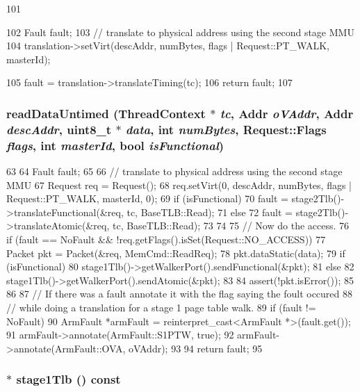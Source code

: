 \begin{DoxyCode}
101 {
102     Fault fault;
103     // translate to physical address using the second stage MMU
104     translation->setVirt(descAddr, numBytes, flags | Request::PT_WALK, masterId);
      
105     fault = translation->translateTiming(tc);
106     return fault;
107 }
\end{DoxyCode}
\hypertarget{classArmISA_1_1Stage2MMU_ac040aef55a7ff520560957793f33f2d0}{
\subsubsection[{readDataUntimed}]{ readDataUntimed ({\bf ThreadContext} $\ast$ {\em tc}, \/  {\bf Addr} {\em oVAddr}, \/  {\bf Addr} {\em descAddr}, \/  uint8\_\-t $\ast$ {\em data}, \/  int {\em numBytes}, \/  {\bf Request::Flags} {\em flags}, \/  int {\em masterId}, \/  bool {\em isFunctional})}}
\label{classArmISA_1_1Stage2MMU_ac040aef55a7ff520560957793f33f2d0}



\begin{DoxyCode}
63 {
64     Fault fault;
65 
66     // translate to physical address using the second stage MMU
67     Request req = Request();
68     req.setVirt(0, descAddr, numBytes, flags | Request::PT_WALK, masterId, 0);
69     if (isFunctional) {
70         fault = stage2Tlb()->translateFunctional(&req, tc, BaseTLB::Read);
71     } else {
72         fault = stage2Tlb()->translateAtomic(&req, tc, BaseTLB::Read);
73     }
74 
75     // Now do the access.
76     if (fault == NoFault && !req.getFlags().isSet(Request::NO_ACCESS)) {
77         Packet pkt = Packet(&req, MemCmd::ReadReq);
78         pkt.dataStatic(data);
79         if (isFunctional) {
80             stage1Tlb()->getWalkerPort().sendFunctional(&pkt);
81         } else {
82             stage1Tlb()->getWalkerPort().sendAtomic(&pkt);
83         }
84         assert(!pkt.isError());
85     }
86 
87     // If there was a fault annotate it with the flag saying the foult occured
88     // while doing a translation for a stage 1 page table walk.
89     if (fault != NoFault) {
90         ArmFault *armFault = reinterpret_cast<ArmFault *>(fault.get());
91         armFault->annotate(ArmFault::S1PTW, true);
92         armFault->annotate(ArmFault::OVA, oVAddr);
93     }
94     return fault;
95 }
\end{DoxyCode}
\hypertarget{classArmISA_1_1Stage2MMU_a88fa1d7ae56b4e726bf33cafc3d336a0}{
\subsubsection[{stage1Tlb}]{$\ast$ stage1Tlb () const}}
\label{classArmISA_1_1Stage2MMU_a88fa1d7ae56b4e726bf33cafc3d336a0}



